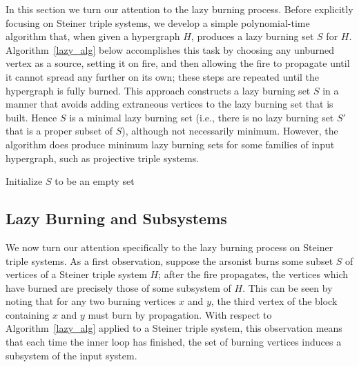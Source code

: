 \documentclass[12pt]{article}
\theoremstyle{definition}
\numberwithin{table}{section}
\begin{document}
In this section we turn our attention to the lazy burning process.  Before explicitly focusing on Steiner triple systems, we develop a simple polynomial-time algorithm that, when given a hypergraph $H$, produces a lazy burning set $S$ for $H$.  Algorithm~\ref{lazy_alg} below accomplishes this task by choosing any unburned vertex as a source, setting it on fire, and then allowing the fire to propagate until it cannot spread any further on its own; these steps are repeated until the hypergraph is fully burned.  This approach constructs a lazy burning set $S$ in a manner that avoids adding extraneous vertices to the lazy burning set that is built.  Hence $S$ is a minimal lazy burning set (i.e., there is no lazy burning set $S'$ that is a proper subset of $S$), although not necessarily minimum.  However, the algorithm does produce minimum lazy burning sets for some families of input hypergraph, such as projective triple systems.  

\begin{algorithm}[ht]




\BlankLine

Initialize $S$ to be an empty set



\caption{Na\"{\i}vely construct a lazy burning set}
\label{lazy_alg}
\end{algorithm}


\subsection{Lazy Burning and Subsystems}

We now turn our attention specifically to the lazy burning process on Steiner triple systems.  
As a first observation, suppose the arsonist burns some subset $S$ of vertices of a Steiner triple system $H$; 
after the fire propagates, the vertices which have burned are precisely those of some subsystem of $H$.  
This can be seen by noting that for any two burning vertices $x$ and $y$, the third vertex of the block containing $x$ and $y$ must burn by propagation.  
With respect to Algorithm~\ref{lazy_alg} applied to a Steiner triple system, this observation means that each time the inner loop has finished, the set of burning vertices induces a subsystem of the input system.
\end{document}
